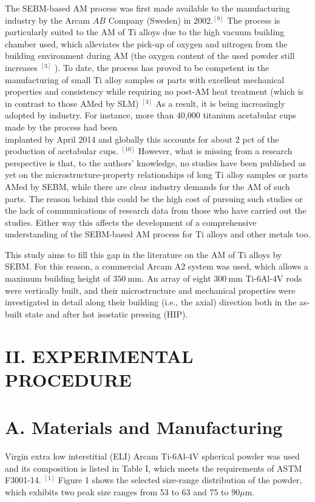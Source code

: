 \documentclass[10pt]{article}
\begin{document}
The SEBM-based AM process was first made available to the manufacturing industry by the Arcam $A B$ Company (Sweden) in $2002 .{ }^{[9]}$ The process is particularly suited to the AM of Ti alloys due to the high vacuum building chamber used, which alleviates the pick-up of oxygen and nitrogen from the building environment during AM (the oxygen content of the used powder still increases ${ }^{[3]}$ ). To date, the process has proved to be competent in the manufacturing of small $\mathrm{Ti}$ alloy samples or parts with excellent mechanical properties and consistency while requiring no post-AM heat treatment (which is in contrast to those AMed by SLM) ${ }^{[3]}$ As a result, it is being increasingly adopted by industry. For instance, more than 40,000 titanium acetabular cups made by the process had been\\
implanted by April 2014 and globally this accounts for about 2 pct of the production of acetabular cups. ${ }^{[10]}$ However, what is missing from a research perspective is that, to the authors' knowledge, no studies have been published as yet on the microstructure-property relationships of long Ti alloy samples or parts AMed by SEBM, while there are clear industry demands for the AM of such parts. The reason behind this could be the high cost of pursuing such studies or the lack of communications of research data from those who have carried out the studies. Either way this affects the development of a comprehensive understanding of the SEBM-based AM process for Ti alloys and other metals too.

This study aims to fill this gap in the literature on the $\mathrm{AM}$ of Ti alloys by SEBM. For this reason, a commercial Arcam A2 system was used, which allows a maximum building height of $350 \mathrm{~mm}$. An array of eight $300 \mathrm{~mm}$ Ti-6Al-4V rods were vertically built, and their microstructure and mechanical properties were investigated in detail along their building (i.e., the axial) direction both in the as-built state and after hot isostatic pressing (HIP).

\section*{II. EXPERIMENTAL PROCEDURE}
\section*{A. Materials and Manufacturing}
Virgin extra low interstitial (ELI) Arcam Ti-6Al-4V spherical powder was used and its composition is listed in Table I, which meets the requirements of ASTM F3001-14. ${ }^{[1]}$ Figure 1 shows the selected size-range distribution of the powder, which exhibits two peak size ranges from 53 to 63 and 75 to $90 \mu \mathrm{m}$.
\end{document}
